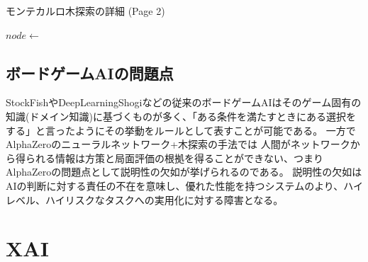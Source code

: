 \begin{algorithm}
	\caption{モンテカルロ木探索の詳細 (Page 2)}
	\begin{algorithmic}[1]
			\State \Return {}
		\EndFunction
		
			\State \Return {}
		\EndFunction
		
			\State \Return {}
		\EndFunction
		
				\State {}
				\State $node \gets$ 
			\EndWhile
		\EndFunction
		
			\State \Return {}
		\EndFunction
	\end{algorithmic}
\end{algorithm}





\subsection{ボードゲームAIの問題点}
StockFish\cite{StockFish}やDeepLearningShogi\cite{dlshogi}などの従来のボードゲームAIはそのゲーム固有の知識(ドメイン知識)に基づくものが多く、「ある条件を満たすときにある選択をする」と言ったようにその挙動をルールとして表すことが可能である。
一方でAlphaZeroのニューラルネットワーク+木探索の手法では
人間がネットワークから得られる情報は方策と局面評価の根拠を得ることができない、つまりAlphaZeroの問題点として説明性の欠如が挙げられるのである。
説明性の欠如はAIの判断に対する責任の不在を意味し、優れた性能を持つシステムのより、ハイレベル、ハイリスクなタスクへの実用化に対する障害となる。



\section{XAI}

